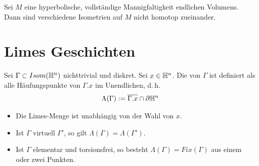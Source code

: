 \documentclass{book}
\begin{document}
\Kor{}
Sei $M$ eine hyperbolische, vollständige Mannigfaltigkeit endlichen Volumens. Dann sind verschiedene Isometrien auf $M$ nicht homotop zueinander.

\section{Limes Geschichten}
\Def{}
Sei $\Gamma \subset Isom(\mathbb{H}^n)$ nichttrivial und diskret. Sei $x \in \mathbb{H}^n$. Die  von $\Gamma$ ist definiert als alle Häufungspunkte von $\Gamma.x$ im Unendlichen, d.\,h.
\[ \Lambda(\Gamma) := \overline{\Gamma.x} \cap \partial \mathbb{H}^n \]
\Bem{}
\begin{itemize}
	\item Die Limes-Menge ist unabhängig von der Wahl von $x$.
	\item Ist $\Gamma$ virtuell $\Gamma'$, so gilt $\Lambda(\Gamma) = \Lambda(\Gamma')$.
	\item Ist $\Gamma$ elementar und torsionsfrei, so besteht $\Lambda(\Gamma) = Fix(\Gamma)$ aus einem oder zwei Punkten.
\end{itemize}
\end{document}
